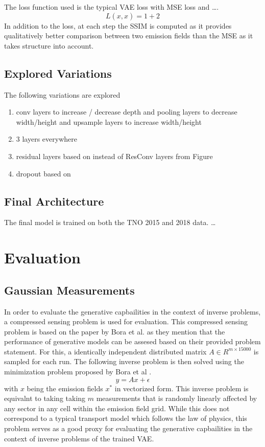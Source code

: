 The loss function used is the typical VAE loss with MSE loss and \dots .
\begin{equation}
    L(x, \hat{x}) = 1 + 2
\end{equation}
In addition to the loss, at each step the SSIM \parencite{SSIM} is computed as it provides qualitatively better comparison between two emission fields than the MSE as it takes structure into account.

\subsection{Explored Variations}
The following variations are explored
\begin{enumerate}
    \item conv layers to increase / decrease depth and pooling layers to decrease width/height and upsample layers to increase width/height
    \item 3 layers everywhere
    \item residual layers based on \parencite{IdentityMappings} instead of ResConv layers from Figure
    \item dropout \parencite{Dropout} based on \parencite{WideResNet}
\end{enumerate}

\subsection{Final Architecture}
The final model is trained on both the TNO 2015 and 2018 data.
\dots

\section{Evaluation}

\subsection{Gaussian Measurements}
In order to evaluate the generative capbailities in the context of inverse problems, a compressed sensing problem is used for evaluation.
This compressed sensing problem is based on the paper by Bora et al. as they mention that the performance of generative models can be assesed based on their provided problem statement.
For this, a identically independent distributed matrix $A \in R^{m \times 15000}$ is sampled for each run.
The following inverse problem is then solved using the minimization problem proposed by Bora et al \parencite{CSUsingAI}.
\begin{equation}
    y = A x + \epsilon
\end{equation}
with $x$ being the emission fields $x^*$ in vectorized form.
This inverse problem is equivalnt to taking taking $m$ measurements that is randomly linearly affected by any sector in any cell within the emission field grid.
While this does not correspond to a typical transport model which follows the law of physics, this problem serves as a good proxy for evaluating the generative capbailities in the context of inverse problems of the trained VAE. 

